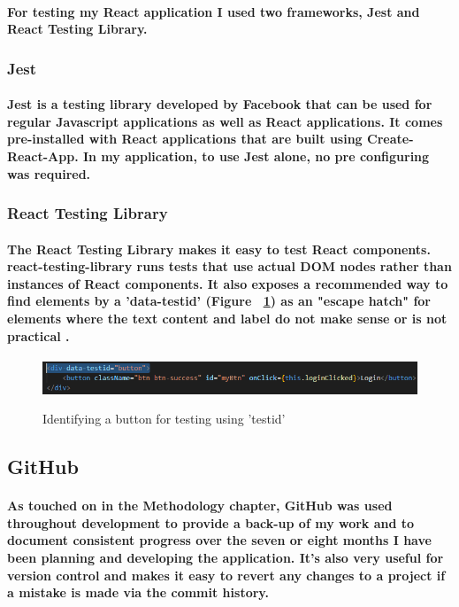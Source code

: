 \paragraph{For testing my React application I used two frameworks, \textbf{Jest} and \textbf{React Testing Library}.}
\subsubsection{Jest}
\paragraph{Jest is a testing library developed by Facebook that can be used for regular Javascript applications as well as React applications. It comes pre-installed with React applications that are built using \textbf{Create-React-App}. In my application, to use Jest alone, no pre configuring was required.}

\subsubsection{React Testing Library}
\paragraph{The React Testing Library makes it easy to test React components. \textbf{react-testing-library} runs tests that use actual DOM nodes rather than instances of React components. It also exposes a recommended way to find elements by a 'data-testid' (Figure ~\ref{testid_label}) as an "escape hatch" for elements where the text content and label do not make sense or is not practical \cite{TestingLibrary}.}

\begin{figure}[h]
    \centering
    \includegraphics[scale=0.6]{Images/test1.png} 
    \label{testid_label}
    \caption{Identifying a button for testing using 'testid'}
\end{figure}

\subsection{GitHub}
\paragraph{As touched on in the Methodology chapter, GitHub was used throughout development to provide a back-up of my work and to document consistent progress over the seven or eight months I have been planning and developing the application. It's also very useful for version control and makes it easy to revert any changes to a project if a mistake is made via the commit history.}
